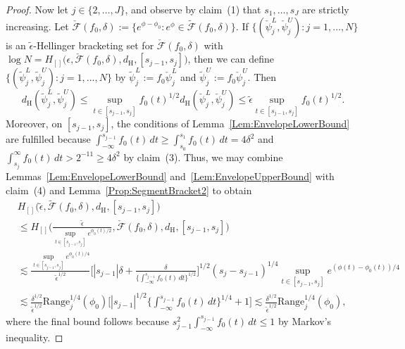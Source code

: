 \documentclass[a4paper,12pt]{article}
\begin{document}
\begin{proof}
Now let $j \in \{2,\ldots,J\}$, and observe by claim~(1) that $s_1,\ldots,s_J$ are strictly increasing.  Let $\check{\mathcal{F}}(f_0,\delta) := \bigl\{e^{\phi - \phi_0}:e^\phi \in \tilde{\mathcal{F}}(f_0,\delta)\bigr\}$.  If $\{(\check{\psi}_j^L,\check{\psi}_j^U):j=1,\ldots,N\}$ is an $\tilde{\epsilon}$-Hellinger bracketing set for $\check{\mathcal{F}}(f_0,\delta)$ with $\log N = H_{[]}\bigl(\epsilon,\check{\mathcal{F}}(f_0,\delta),d_{\mathrm{H}},[s_{j-1},s_j]\bigr)$, then we can define $\{(\tilde{\psi}_j^L,\tilde{\psi}_j^U):j=1,\ldots,N\}$ by $\tilde{\psi}_j^L := f_0 \check{\psi}_j^L$ and $\tilde{\psi}_j^U := f_0 \check{\psi}_j^U$.  Then
\[
d_{\mathrm{H}}(\tilde{\psi}_j^L,\tilde{\psi}_j^U) \leq \sup_{t \in [s_{j-1},s_j]} f_0(t)^{1/2} d_{\mathrm{H}}(\check{\psi}_j^L,\check{\psi}_j^U) \leq \tilde{\epsilon} \sup_{t \in [s_{j-1},s_j]} f_0(t)^{1/2}.
\]
Moreover, on $[s_{j-1}, s_j]$, the conditions of Lemma~\ref{Lem:EnvelopeLowerBound} are fulfilled because $\int_{-\infty}^{s_{j-1}} f_0(t)\, dt \geq \int_{s_0}^{s_1} f_0(t)\, dt = 4\delta^2$ and $\int_{s_j}^\infty f_0(t)\, dt > 2^{-11} \geq 4\delta^2$ by claim~(3). Thus, we may combine Lemmas~\ref{Lem:EnvelopeLowerBound} and~\ref{Lem:EnvelopeUpperBound} with claim~(4) and Lemma~\ref{Prop:SegmentBracket2} to obtain
  \begin{align}
\label{Eq:KeyDisplay}
   & H_{[]}\bigl(\tilde{\epsilon}, \tilde{\mathcal{F}}(f_0, \delta), d_{\mathrm{H}}, [s_{j-1}, s_j]\bigr) \nonumber \\
&\leq H_{[]}\biggl(\frac{\tilde{\epsilon}}{\sup_{t \in [s_{j-1},s_j]} e^{\phi_0(t)/2}}, \check{\mathcal{F}}(f_0, \delta), d_{\mathrm{H}}, [s_{j-1}, s_j]\biggr) \nonumber \\
&\lesssim \frac{\sup_{t \in [s_{j-1},s_j]} e^{\phi_0(t)/4}}{\tilde{\epsilon}^{1/2}}\biggl[|s_{j-1}|\delta + \frac{\delta}{\bigl\{\int_{-\infty}^{s_{j-1}} f_0(t) \, dt \bigr\}^{1/2}}\biggr]^{1/2}(s_j - s_{j-1})^{1/4}\sup_{t \in [s_{j-1},s_j]}e^{(\phi(t)-\phi_0(t))/4} \nonumber \\
& \lesssim \frac{\delta^{1/2}}{\tilde{\epsilon}^{1/2}}\mathrm{Range}_j^{1/4}(\phi_0)\biggl[|s_{j-1}|^{1/2} \biggl\{\int_{-\infty}^{s_{j-1}} f_0(t) \, dt \biggr\}^{1/4} + 1\biggr] \lesssim \frac{\delta^{1/2}}{\tilde{\epsilon}^{1/2}}\mathrm{Range}_j^{1/4}(\phi_0),
  \end{align}
where the final bound follows because $s_{j-1}^2 \int_{-\infty}^{s_{j-1}} f_0(t) \, dt  \leq 1$ by Markov's inequality.  


\end{proof}
\end{document}

